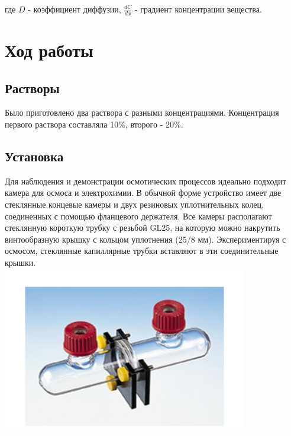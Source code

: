 \documentclass{article}
\begin{document}
            где $D$ - коэффициент диффузии, $\frac{dC}{dx}$ - градиент концентрации
            вещества. \\

    \newpage
    \section*{Ход работы}

        \subsection*{Растворы}
            \hspace*{4mm}Было приготовлено два раствора  с разными концентрациями.
            Концентрация первого раствора составляла 10\%, второго - 20\%.


        \subsection*{Установка}
            \hspace*{4mm}Для наблюдения и демонстрации осмотических процессов идеально
            подходит камера для осмоса и электрохимии. В обычной форме
            устройство имеет две стеклянные концевые камеры и двух резиновых
            уплотнительных колец, соединенных с помощью фланцевого держателя. Все
            камеры располагают стеклянную короткую трубку с резьбой GL25, на которую
            можно накрутить винтообразную крышку с кольцом уплотнения (25/8 мм).
            Экспериментируя с осмосом, стеклянные капиллярные трубки вставляют в эти
            соединительные крышки. \\
        
            \includegraphics*[width=0.8\textwidth]{tools1.png} \\
\end{document}

